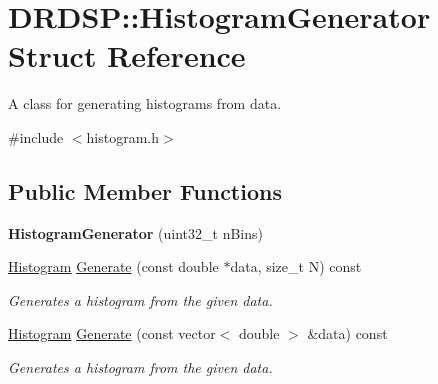 \hypertarget{struct_d_r_d_s_p_1_1_histogram_generator}{\section{D\-R\-D\-S\-P\-:\-:Histogram\-Generator Struct Reference}
\label{struct_d_r_d_s_p_1_1_histogram_generator}
}


A class for generating histograms from data.  




{\ttfamily \#include $<$histogram.\-h$>$}

\subsection*{Public Member Functions}
\begin{DoxyCompactItemize}
\item 
\hypertarget{struct_d_r_d_s_p_1_1_histogram_generator_a9eda2d2c8db47d55b32eee8033f5f268}{{\bfseries Histogram\-Generator} (uint32\-\_\-t n\-Bins)}\label{struct_d_r_d_s_p_1_1_histogram_generator_a9eda2d2c8db47d55b32eee8033f5f268}

\item 
\hypertarget{struct_d_r_d_s_p_1_1_histogram_generator_af1acac305990b01bc4cc6e612415bf72}{\hyperlink{struct_d_r_d_s_p_1_1_histogram}{Histogram} \hyperlink{struct_d_r_d_s_p_1_1_histogram_generator_af1acac305990b01bc4cc6e612415bf72}{Generate} (const double $\ast$data, size\-\_\-t N) const }\label{struct_d_r_d_s_p_1_1_histogram_generator_af1acac305990b01bc4cc6e612415bf72}

\begin{DoxyCompactList}\small\item\em Generates a histogram from the given data. \end{DoxyCompactList}\item 
\hypertarget{struct_d_r_d_s_p_1_1_histogram_generator_a145bb9b1ea633982ef24849107988c09}{\hyperlink{struct_d_r_d_s_p_1_1_histogram}{Histogram} \hyperlink{struct_d_r_d_s_p_1_1_histogram_generator_a145bb9b1ea633982ef24849107988c09}{Generate} (const vector$<$ double $>$ \&data) const }\label{struct_d_r_d_s_p_1_1_histogram_generator_a145bb9b1ea633982ef24849107988c09}

\begin{DoxyCompactList}\small\item\em Generates a histogram from the given data. \end{DoxyCompactList}\end{DoxyCompactItemize}
